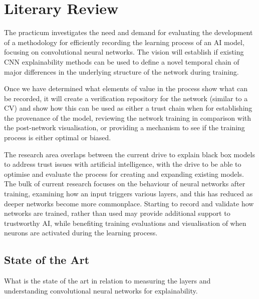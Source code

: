\section{Literary Review}

The practicum investigates the need and demand for evaluating the development of a methodology for efficiently recording the learning process of an AI model, focusing on convolutional neural networks. The vision will establish if existing CNN explainability methods can be used to define a novel temporal chain of major differences in the underlying structure of the network during training.
 
Once we have determined what elements of value in the process show what can be recorded, it will create a verification repository for the network (similar to a CV) and show how this can be used as either a trust chain when for establishing the provenance of the model, reviewing the network training in comparison with the post-network visualisation, or providing a mechanism to see if the training process is either optimal or biased.

The research area overlaps between the current drive to explain black box models to address trust issues with artificial intelligence, with the drive to be able to optimise and evaluate the process for creating and expanding existing models. The bulk of current research focuses on the behaviour of neural networks after training, examining how an input triggers various layers, and this has reduced as deeper networks become more commonplace. Starting to record and validate how networks are trained, rather than used may provide additional support to trustworthy AI, while benefiting training evaluations and visualisation of when neurons are activated during the learning process.


\subsection{State of the Art}
What is the state of the art in relation to measuring the layers and understanding convolutional neural networks for explainability.

